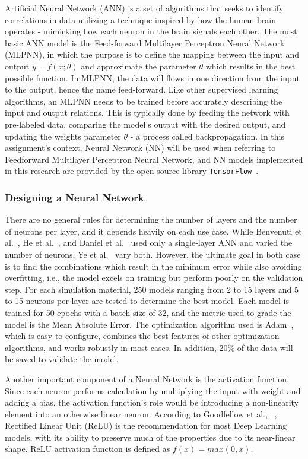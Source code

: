 Artificial Neural Network (ANN) is a set of algorithms that seeks to identify correlations in data utilizing a technique inspired by how the human brain operates - mimicking how each neuron in the brain signals each other. The most basic ANN model is the Feed-forward Multilayer Perceptron Neural Network (MLPNN), in which the purpose is to define the mapping between the input and output \(y = f(x;\theta)\) and approximate the parameter \(\theta\) which results in the best possible function. In MLPNN, the data will flows in one direction from the input to the output, hence the name feed-forward. Like other supervised learning algorithms, an MLPNN needs to be trained before accurately describing the input and output relations. This is typically done by feeding the network with pre-labeled data, comparing the model's output with the desired output, and updating the weights parameter \(\theta\) - a process called backpropagation. In this assignment's context, Neural Network (NN) will be used when referring to Feedforward Multilayer Perceptron Neural Network, and NN models implemented in this research are provided by the open-source library \texttt{TensorFlow}~\cite{tensorflow2015-whitepaper}.

\subsubsection{Designing a Neural Network}

There are no general rules for determining the number of layers and the number of neurons per layer, and it depends heavily on each use case. While Benvenuti et al.~\cite{nn-calibration}, He et al.~\cite{NN-GA}, and Daniel et al.~\cite{NN-coarse} used only a single-layer ANN and varied the number of neurons, Ye et al.~\cite{YE2019292} vary both. However, the ultimate goal in both case is to find the combinations which result in the minimum error while also avoiding overfitting, i.e., the model excels on training but perform poorly on the validation step. For each simulation material, 250 models ranging from 2 to 15 layers and 5 to 15 neurons per layer are tested to determine the best model. Each model is trained for 50 epochs with a batch size of 32, and the metric used to grade the model is the Mean Absolute Error. The optimization algorithm used is Adam~\cite{adam}, which is easy to configure, combines the best features of other optimization algorithms, and works robustly in most cases. In addition, 20\% of the data will be saved to validate the model. 

Another important component of a Neural Network is the activation function. Since each neuron performs calculation by multiplying the input with weight and adding a bias, the activation function's role would be introducing a non-linearity element into an otherwise linear neuron. According to Goodfellow et al., ~\cite{DL-Goodfellow}, Rectified Linear Unit (ReLU) is the recommendation for most Deep Learning models, with its ability to preserve much of the properties due to its near-linear shape. ReLU activation function is defined as $f(x) = max(0, x)$. 


